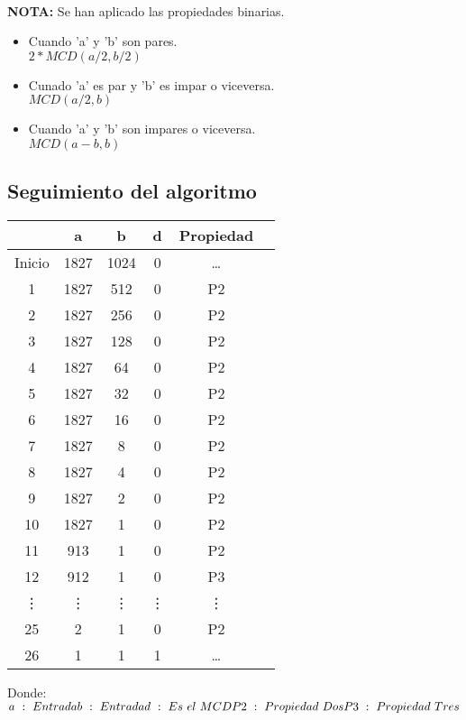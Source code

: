 \documentclass[11pt, conference]{IEEEtran}
\begin{document}
\

\textbf{NOTA:} Se han aplicado las propiedades binarias.
\begin{itemize}
	\item Cuando 'a' y 'b' son pares. \\
		  $2*MCD(a/2,b/2)$
	\item Cunado 'a' es par y 'b' es impar o viceversa. \\
		  $MCD(a/2,b)$
	\item Cuando 'a' y 'b' son impares o viceversa. \\
		  $MCD(a-b,b)$
\end{itemize}

\pagebreak

\subsection{Seguimiento del algoritmo}

\begin{center}
	\begin{tabular}{|c|c|c|c|c|c|}
		\hline
		& \textbf{a}& \textbf{b} & \textbf{d} & \textbf{Propiedad}\\	\hline
		Inicio & 1827 & 1024 & 0 & \ldots\\ \hline
		1 & 1827 & 512 & 0 & P2\\ \hline
		2 & 1827 & 256 & 0 & P2\\ \hline
		3 & 1827 & 128 & 0 & P2\\ \hline
		4 & 1827 & 64  & 0 & P2\\ \hline
		5 & 1827 & 32 & 0 & P2\\ \hline
		6 & 1827 & 16 & 0 & P2\\ \hline
		7 & 1827 & 8 & 0 & P2\\ \hline
		8 & 1827 & 4  & 0 & P2\\ \hline
		9 & 1827 & 2 & 0 & P2\\ \hline
		10 & 1827 & 1 & 0 & P2\\ \hline
		11 & 913 & 1 & 0 & P2\\ \hline
		12 & 912 & 1  & 0 &  P3\\ \hline
		\vdots & \vdots & \vdots& \vdots & \vdots\\ \hline
		25 & 2 & 1 & 0& P2\\ \hline
		26 & 1 & 1 & 1& \ldots\\ \hline
	\end{tabular}
\end{center}
Donde:\\
$
a\ :\ Entrada \\
b\ :\ Entrada \\	
d\ :\ Es\ el\ MCD\\	
P2\ :\ Propiedad\ Dos\\
P3\ :\ Propiedad\ Tres\\
$
\bigskip\bigskip\bigskip\bigskip\bigskip\bigskip
\bigskip\bigskip\bigskip\bigskip\bigskip\bigskip
\bigskip\bigskip\bigskip\bigskip\bigskip\bigskip
\end{document}

